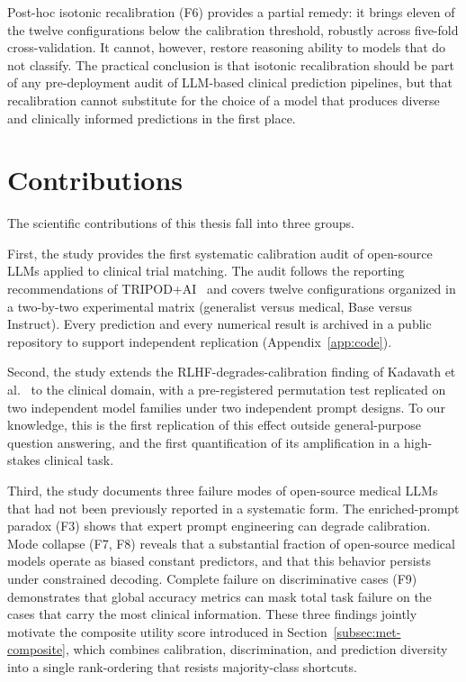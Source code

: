Post-hoc isotonic recalibration (F6) provides a partial remedy: it 
brings eleven of the twelve configurations below the calibration 
threshold, robustly across five-fold cross-validation. It cannot, 
however, restore reasoning ability to models that do not classify. The 
practical conclusion is that isotonic recalibration should be part of 
any pre-deployment audit of LLM-based clinical prediction pipelines, 
but that recalibration cannot substitute for the choice of a model 
that produces diverse and clinically informed predictions in the first 
place.

\section{Contributions}
\label{sec:conc-contributions}

The scientific contributions of this thesis fall into three groups.

First, the study provides the first systematic calibration audit of 
open-source LLMs applied to clinical trial matching. The audit follows 
the reporting recommendations of TRIPOD+AI~\cite{collins2024tripod} and 
covers twelve configurations organized in a two-by-two experimental 
matrix (generalist versus medical, Base versus Instruct). Every 
prediction and every numerical result is archived in a public 
repository to support independent replication (Appendix~\ref{app:code}).

Second, the study extends the RLHF-degrades-calibration finding of 
Kadavath et al.~\cite{kadavath2022know} to the clinical domain, with a 
pre-registered permutation test replicated on two independent model 
families under two independent prompt designs. To our knowledge, this 
is the first replication of this effect outside general-purpose 
question answering, and the first quantification of its amplification 
in a high-stakes clinical task.

Third, the study documents three failure modes of open-source medical 
LLMs that had not been previously reported in a systematic form. The 
enriched-prompt paradox (F3) shows that expert prompt engineering can 
degrade calibration. Mode collapse (F7, F8) reveals that a substantial 
fraction of open-source medical models operate as biased constant 
predictors, and that this behavior persists under constrained decoding. 
Complete failure on discriminative cases (F9) demonstrates that global 
accuracy metrics can mask total task failure on the cases that carry 
the most clinical information. These three findings jointly motivate 
the composite utility score introduced in 
Section~\ref{subsec:met-composite}, which combines calibration, 
discrimination, and prediction diversity into a single rank-ordering 
that resists majority-class shortcuts.

